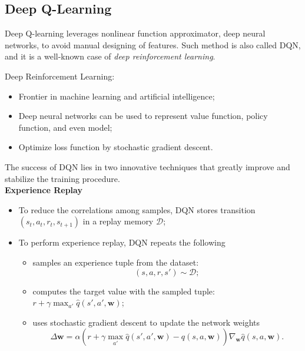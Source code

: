 \documentclass{progartcn}
\begin{document}
\begin{comment}
		\label{sub:batch_methods}
		
	\end{comment}
	\subsection{Deep Q-Learning} %

		Deep Q-learning leverages nonlinear function approximator, deep neural networks, to avoid manual designing of features. Such method is also called DQN, and it is a well-known case of \textit{deep reinforcement learning}.

		Deep Reinforcement Learning:
		\begin{itemize}[noitemsep,topsep=0pt]
			\item Frontier in machine learning and artificial intelligence;
			\item Deep neural networks can be used to represent value function, policy function, and even model;
			\item Optimize loss function by stochastic gradient descent.\\
		\end{itemize}

		The success of DQN lies in two innovative techniques that greatly improve and stabilize the training procedure.\\

		\textbf{Experience Replay}
		\begin{itemize}[noitemsep,topsep=0pt]
			\item To reduce the correlations among samples, DQN stores transition $(s_t,a_t,r_t,s_{t+1})$ in a replay memory $\mathcal{D}$;
			\item To perform experience replay, DQN repeats the following
			\begin{itemize}[noitemsep,topsep=0pt]
			\item samples an experience tuple from the dataset: 
			\[(s,a,r,s') \sim \mathcal{D};\]
			\item computes the target value with the sampled tuple: $r + \gamma\max_{a'} \hat{q}(s', a', \bm{w})$;
			\item uses stochastic gradient descent to update the network weights
			\[\Delta\bm{w}=\alpha(r+\gamma\max_{a'}\hat{q}(s',a',\bm{w})-q(s,a,\bm{w}))\nabla_{\bm{w}}\hat{q}(s,a,\bm{w}).\]
			\end{itemize}
		\end{itemize}
\end{document}
